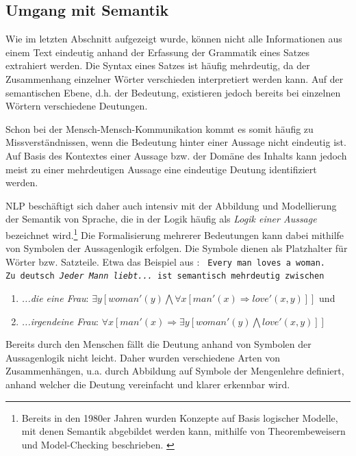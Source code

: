 \documentclass[12pt]{report}
\begin{document}
\subsection{Umgang mit Semantik}
Wie im letzten Abschnitt aufgezeigt wurde, können nicht alle Informationen aus einem Text eindeutig anhand der Erfassung der Grammatik eines Satzes extrahiert werden. Die Syntax eines Satzes ist häufig mehrdeutig, da der Zusammenhang einzelner Wörter verschieden interpretiert werden kann. Auf der semantischen Ebene, d.h. der Bedeutung, existieren jedoch bereits bei einzelnen Wörtern verschiedene Deutungen. 

Schon bei der Mensch-Mensch-Kommunikation kommt es somit häufig zu Missverständnissen, wenn die Bedeutung hinter einer Aussage nicht eindeutig ist. Auf Basis des Kontextes einer Aussage bzw. der Domäne des Inhalts kann jedoch meist zu einer mehrdeutigen Aussage eine eindeutige Deutung identifiziert werden.

NLP beschäftigt sich daher auch intensiv mit der Abbildung und Modellierung der Semantik von Sprache, die in der Logik häufig als \glqq \textit{Logik einer Aussage}\grqq{} bezeichnet wird.\footnote{Bereits in den 1980er Jahren wurden Konzepte auf Basis logischer Modelle, mit denen Semantik abgebildet werden kann, mithilfe von Theorembeweisern und Model-Checking beschrieben. \cite{sb88} \cite{kn85}} Die Formalisierung mehrerer Bedeutungen kann dabei mithilfe von Symbolen der Aussagenlogik erfolgen. Die Symbole dienen als Platzhalter für Wörter bzw. Satzteile. Etwa das Beispiel aus \cite{rs18}:
\vspace{12pt}
\tt
Every man loves a woman.
\rm
\\
Zu deutsch \textit{\glqq  Jeder Mann liebt...\grqq{}} ist semantisch mehrdeutig zwischen  
\begin{enumerate}
\item \textit{\glqq  ...die eine Frau\grqq{}}: $\exists y [woman'(y) \bigwedge \forall x [man'(x) \Rightarrow love'(x,y)]]$ und
\item \textit{\glqq  ...irgendeine Frau\grqq{}}: $\forall x [man'(x) \Rightarrow \exists y [woman'(y) \bigwedge love'(x,y)]]$
\end{enumerate}

Bereits durch den Menschen fällt die Deutung anhand von Symbolen der Aussagenlogik nicht leicht. Daher wurden verschiedene Arten von Zusammenhängen, u.a. durch Abbildung auf Symbole der Mengenlehre definiert, anhand welcher die Deutung vereinfacht und klarer erkennbar wird. 
\end{document}
